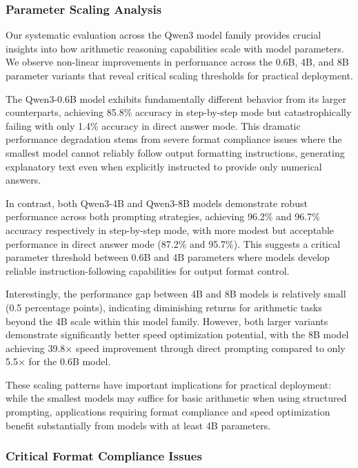 \documentclass{article}
\begin{document}
\subsubsection{Parameter Scaling Analysis}

Our systematic evaluation across the Qwen3 model family provides crucial insights into how arithmetic reasoning capabilities scale with model parameters. We observe non-linear improvements in performance across the 0.6B, 4B, and 8B parameter variants that reveal critical scaling thresholds for practical deployment.

The Qwen3-0.6B model exhibits fundamentally different behavior from its larger counterparts, achieving 85.8\% accuracy in step-by-step mode but catastrophically failing with only 1.4\% accuracy in direct answer mode. This dramatic performance degradation stems from severe format compliance issues where the smallest model cannot reliably follow output formatting instructions, generating explanatory text even when explicitly instructed to provide only numerical answers.

In contrast, both Qwen3-4B and Qwen3-8B models demonstrate robust performance across both prompting strategies, achieving 96.2\% and 96.7\% accuracy respectively in step-by-step mode, with more modest but acceptable performance in direct answer mode (87.2\% and 95.7\%). This suggests a critical parameter threshold between 0.6B and 4B parameters where models develop reliable instruction-following capabilities for output format control.

Interestingly, the performance gap between 4B and 8B models is relatively small (0.5 percentage points), indicating diminishing returns for arithmetic tasks beyond the 4B scale within this model family. However, both larger variants demonstrate significantly better speed optimization potential, with the 8B model achieving 39.8× speed improvement through direct prompting compared to only 5.5× for the 0.6B model.

These scaling patterns have important implications for practical deployment: while the smallest models may suffice for basic arithmetic when using structured prompting, applications requiring format compliance and speed optimization benefit substantially from models with at least 4B parameters.

\subsubsection{Critical Format Compliance Issues}
\end{document}
